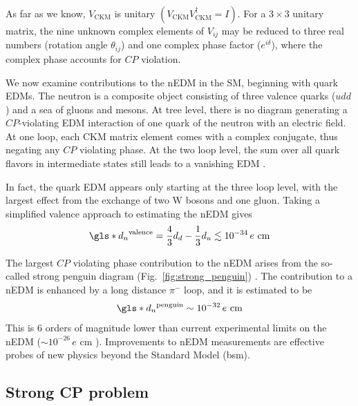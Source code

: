 As far as we know, $V_\text{CKM}$ is unitary $(V_\text{CKM}V_\text{CKM}^\dag=I)$. For a $3 \times 3$ unitary matrix, the nine unknown complex elements of $V_{ij}$ may be reduced to three real numbers (rotation angle $\theta_{ij}$) and one complex phase factor ($e^{i\delta}$), where the complex phase accounts for $CP$ violation.

We now examine contributions to the nEDM in the SM, beginning with quark EDMs. The neutron is a composite object consisting of three valence quarks ($udd$) and a sea of gluons and mesons. At tree level, there is no diagram generating a $CP$-violating EDM interaction of one quark of the neutron with an electric field. At one loop, each CKM matrix element comes with a complex conjugate, thus negating any $CP$ violating phase. At the two loop level, the sum over all quark flavors in intermediate states still leads to a vanishing EDM \cite{schmidt-wellenburg_quest_2017, czarnecki_valence_model_1997}.

In fact, the quark EDM appears only starting at the three loop level, with the largest effect from the exchange of two W bosons and one gluon. Taking a simplified valence approach to estimating the nEDM gives \cite{czarnecki_valence_model_1997}
%
\begin{gather}
    \gls*{d_n}^\text{valence} = \frac{4}{3}d_d - \frac{1}{3}d_u \lesssim 10^{-34}\,e\text{ cm}
\end{gather}

The largest $CP$ violating phase contribution to the nEDM arises from the so-called strong penguin diagram (Fig.~\ref{fig:strong_penguin}) \cite{POS05}. The contribution to a nEDM is enhanced by a long distance $\pi^-$ loop, and it is estimated to be
%
\begin{gather}
    \gls*{d_n}^\text{penguin} \sim 10^{-32}\,e\text{ cm}
\end{gather}
%
This is 6 orders of magnitude lower than current experimental limits on the nEDM ($\sim 10^{-26}\,e\text{ cm}$ \cite{ABE20}). Improvements to nEDM measurements are effective probes of new physics beyond the Standard Model (\acrshort*{bsm}).


\subsection{Strong CP problem}


